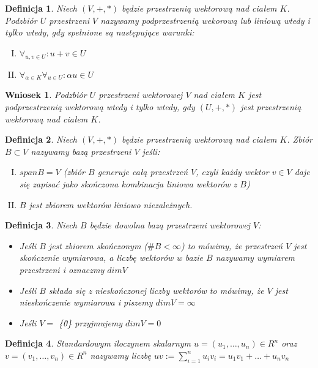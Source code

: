 \documentclass[12pt,a4paper]{article}
\newtheorem{df}{Definicja}[section]
\newtheorem{wn}{Wniosek}[section]
\begin{document}
\begin{df}
Niech $(V, +, *)$ b\k{e}dzie przestrzeni\k{a} wektorow\k{a} nad cia{\l}em $K$. Podzbi\'or $U$ przestrzeni $V$ nazywamy podprzestrzeni\k{a} wekorow\k{a} lub liniow\k{a} wtedy i tylko wtedy, gdy spe{\l}nione s\k{a} nast\k{e}puj\k{a}ce warunki:
\begin{enumerate}[I.]
\item $\forall_{u,v\in U}: u+v\in U$ 
\item $\forall_{\alpha\in K}\forall_{u\in U}: \alpha u\in U$
\end{enumerate}
\end{df}
\begin{wn}
Podzbi\'or $U$ przestrzeni wektorowej $V$ nad cia{\l}em $K$ jest podprzestrzeni\k{a} wektorow\k{a} wtedy i tylko wtedy, gdy $(U, +, *)$ jest przestrzeni\k{a} wektorow\k{a} nad cia{\l}em $K$.
\end{wn}
\begin{df}
Niech $(V, +, *)$ b\k{e}dzie przestrzeni\k{a} wektorow\k{a} nad cia{\l}em $K$. Zbi\'{o}r $B \subset V$ nazywamy baz\k{a} przestrzeni $V$ je\'{s}li:
\begin{enumerate}[I.]
\item $span B = V$ (zbi\'{o}r $B$ generuje ca{\l}\k{a} przestrze\'{n} $V$, czyli ka\.{z}dy wektor $v \in V$ daje si\k{e} zapisa\'{c} jako sko\'{n}czona kombinacja liniowa wektor\'{o}w z $B$)
\item $B$ jest zbiorem wektor\'{o}w liniowo niezale\.{z}nych.
\end{enumerate}
\end{df}
\begin{df}
Niech $B$ b\k{e}dzie dowolna baz\k{a} przestrzeni wektorowej $V$:
\begin{itemize}
\item Je\'{s}li $B$ jest zbiorem sko\'{n}czonym ($\#B<\infty$) to m\'{o}wimy, \.{z}e przestrze\'{n} $V$ jest sko\'{n}czenie wymiarowa, a liczb\k{e} wektor\'{o}w w bazie $B$ nazywamy wymiarem przestrzeni i oznaczmy $dim V$
\item Je\'{s}li $B$ sk{\l}ada si\k{e} z niesko\'{n}czonej liczby wektor\'{o}w to m\'{o}wimy, \.{z}e $V$ jest niesko\'{n}czenie wymiarowa i piszemy $dim V = \infty$
\item Je\'{s}li $V =$ \{\={0}\} przyjmujemy $dim V = 0$
\end{itemize}
\end{df}
\begin{df}
Standardowym iloczynem skalarnym $u = (u_{1}, \dots, u_{n}) \in R^{n}$ oraz $v = (v_{1}, \dots, v_{n}) \in R^{n}$ nazywamy liczb\k{e} $u$\textopenbullet $v := \sum_{i=1}^{n} u_{i}v_{i} = u_{1}v_{1} + \dots + u_{n}v_{n}$
\end{df}
\end{document}
